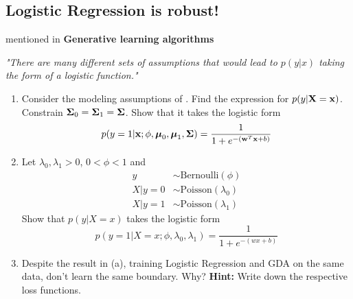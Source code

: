 \subsection{Logistic Regression is robust!}
\cite{ng2023cs229} mentioned in \textbf{Generative learning algorithms}
\begin{center}
    \textit{"There are many different sets of assumptions that would lead to $p(y|x)$ taking the form of a logistic function."}
\end{center}

\begin{enumerate}[label=\alph*)]
\item 
Consider the modeling assumptions of . Find the expression for $p(y | \mathbf{X} = \mathbf{x})$. Constrain $\boldsymbol{\Sigma}_0 = \boldsymbol{\Sigma}_1 = \boldsymbol{\Sigma}$. Show that it takes the logistic form
\begin{equation*}
    p(y = 1 | \mathbf{x} ; \phi, \boldsymbol{\mu}_0, \boldsymbol{\mu}_1, \boldsymbol{\Sigma}) = \frac{1}{1 + e^{-(\mathbf{w}^T \mathbf{x} + b)}}
\end{equation*}

\item Let $\lambda_0, \lambda_1 > 0$, $0 < \phi < 1$ and 
\begin{align*}
        y        &\sim \text{Bernoulli}(\phi)\\
        X | y = 0 &\sim \text{Poisson}(\lambda_0)\\
        X | y = 1 &\sim \text{Poisson}(\lambda_1)
\end{align*}
Show that $p(y | X = x)$ takes the logistic form
\begin{equation*}
    p(y = 1 | X = x ; \phi, \lambda_0, \lambda_1) = \frac{1}{1 + e^{-(wx + b)}}
\end{equation*}

\item  Despite the result in (a), training Logistic Regression and GDA on the same data, don't learn the same boundary. Why? \textbf{Hint:} Write down the respective loss functions.

\end{enumerate}



